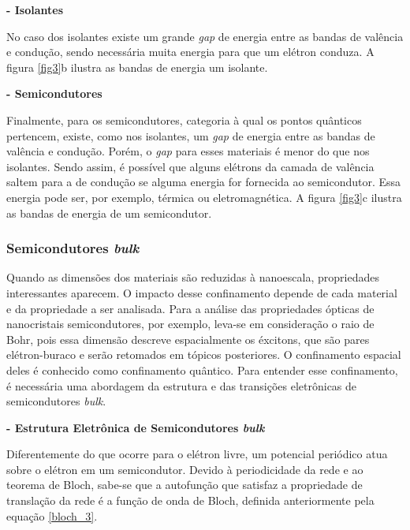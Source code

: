 	\par \textbf{- Isolantes}

		\par No caso dos isolantes existe um grande \textit{gap} de energia entre as bandas de valência e condução, sendo necessária muita energia para que um elétron conduza. A figura \ref{fig3}b ilustra as bandas de energia um isolante.

	\par \textbf{- Semicondutores}
	
		\par Finalmente, para os semicondutores, categoria à qual os pontos quânticos pertencem, existe, como nos isolantes, um \textit{gap} de energia entre as bandas de valência e condução. Porém, o \textit{gap} para esses materiais é menor do que nos isolantes. Sendo assim, é possível que alguns elétrons da camada de valência saltem para a de condução se alguma energia for fornecida ao semicondutor. Essa energia pode ser, por exemplo, térmica ou eletromagnética. A figura \ref{fig3}c ilustra as bandas de energia de um semicondutor.

\subsubsection{Semicondutores \textit{bulk}}

	\par Quando as dimensões dos materiais são reduzidas à nanoescala, propriedades interessantes aparecem. O impacto desse confinamento depende de cada material e da propriedade a ser analisada. Para a análise das propriedades ópticas de nanocristais semicondutores, por exemplo, leva-se em consideração o raio de Bohr, pois essa dimensão descreve espacialmente os éxcitons, que são pares elétron-buraco e serão retomados em tópicos posteriores. O confinamento espacial deles é conhecido como confinamento quântico. Para entender esse confinamento, é necessária uma abordagem da estrutura e das transições eletrônicas de semicondutores \textit{bulk}. 

	\par \textbf{- Estrutura Eletrônica de Semicondutores \textit{bulk}}

		\par Diferentemente do que ocorre para o elétron livre, um potencial periódico atua sobre o elétron em um semicondutor. Devido à periodicidade da rede e ao teorema de Bloch, sabe-se que a autofunção que satisfaz a propriedade de translação da rede é a função de onda de Bloch, definida anteriormente pela equação \eqref{bloch_3}.

